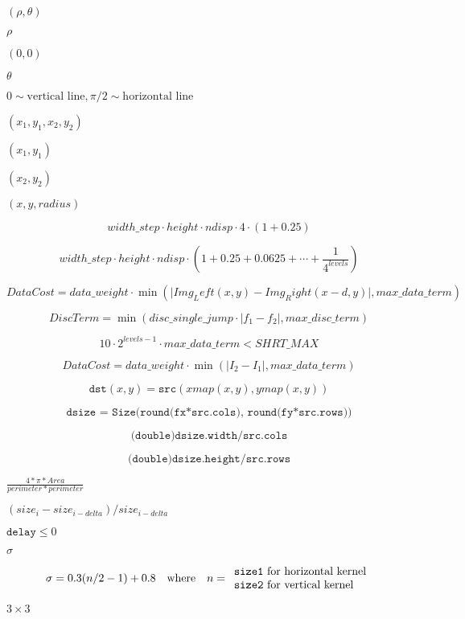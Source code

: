 \documentclass{article}
\begin{document}
$(\rho, \theta)$
\pagebreak

$\rho$
\pagebreak

$(0,0)$
\pagebreak

$\theta$
\pagebreak

$0 \sim \textrm{vertical line}, \pi/2 \sim \textrm{horizontal line}$
\pagebreak

$(x_1, y_1, x_2, y_2)$
\pagebreak

$(x_1,y_1)$
\pagebreak

$(x_2, y_2)$
\pagebreak

$(x, y, radius)$
\pagebreak

\[width \_ step \cdot height \cdot ndisp \cdot 4 \cdot (1 + 0.25)\]
\pagebreak

\[width\_step \cdot height \cdot ndisp \cdot (1 + 0.25 + 0.0625 + \dotsm + \frac{1}{4^{levels}})\]
\pagebreak

\[DataCost = data \_ weight \cdot \min ( \lvert Img_Left(x,y)-Img_Right(x-d,y) \rvert , max \_ data \_ term)\]
\pagebreak

\[DiscTerm = \min (disc \_ single \_ jump \cdot \lvert f_1-f_2 \rvert , max \_ disc \_ term)\]
\pagebreak

\[10 \cdot 2^{levels-1} \cdot max \_ data \_ term < SHRT \_ MAX\]
\pagebreak

\[DataCost = data \_ weight \cdot \min ( \lvert I_2-I_1 \rvert , max \_ data \_ term)\]
\pagebreak

\[\texttt{dst} (x,y) = \texttt{src} (xmap(x,y), ymap(x,y))\]
\pagebreak

\[\texttt{dsize = Size(round(fx*src.cols), round(fy*src.rows))}\]
\pagebreak

\[\texttt{(double)dsize.width/src.cols}\]
\pagebreak

\[\texttt{(double)dsize.height/src.rows}\]
\pagebreak

$\frac{4*\pi*Area}{perimeter * perimeter}$
\pagebreak

$(size_{i}-size_{i-delta})/size_{i-delta}$
\pagebreak

$\texttt{delay}\leq 0$
\pagebreak

$\sigma$
\pagebreak

\[\sigma = 0.3 (n/2 - 1) + 0.8 \quad \text{where} \quad n= \begin{array}{l l} \mbox{\texttt{size1} for horizontal kernel} \\ \mbox{\texttt{size2} for vertical kernel} \end{array}\]
\pagebreak

$3\times 3$
\pagebreak
\end{document}
